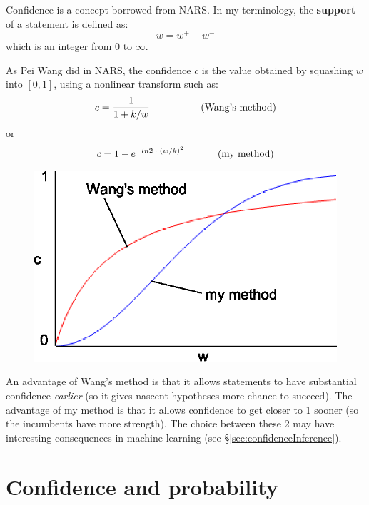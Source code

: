 Confidence is a concept borrowed from NARS.  In my terminology, the \textbf{support} of a statement is defined as:
\begin{equation}
w = w^+ + w^-
\end{equation}
which is an integer from 0 to $\infty$.

As Pei Wang did in NARS, the confidence $c$ is the value obtained by squashing $w$ into $[0,1]$, using a nonlinear transform such as:
\begin{equation}
 c = \frac{1}{1 + k/w} \hspace*{1.8cm}  \mbox{(Wang's method)}
\end{equation}
or \vspace{-0.3cm}
\begin{equation}
 c = 1 - e^{-ln2 \; \cdot \; (w / k)^2} \hspace*{1.2cm}  \mbox{(my method)}
\end{equation}
\vspace{-0.8cm}

\begin{figure}[H]
\centering
\includegraphics[scale=0.8]{Wang-vs-YKY-confidence-squashing-fn.eps}
\end{figure}

An advantage of Wang's method is that it allows statements to have substantial confidence \textit{earlier} (so it gives nascent hypotheses more chance to succeed).  The advantage of my method is that it allows confidence to get closer to 1 sooner (so the incumbents have more strength).  The choice between these 2 may have interesting consequences in machine learning (see \S\ref{sec:confidenceInference}).

\section{Confidence and probability}

